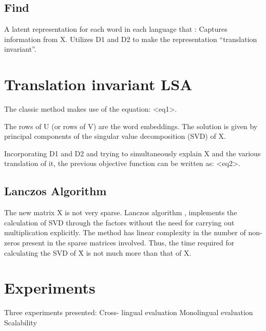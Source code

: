 \documentclass[11pt]{article}
\begin{document}
\subsection{Find}
A latent representation for each word in each language that :
Captures information from X.
Utilizes D1 and D2 to make the representation “translation invariant”.



\section{Translation invariant LSA}
The classic method makes use of the equation: <eq1>.

The rows of U (or rows of V) are the word embeddings.
The solution is given by principal components of the singular value decomposition (SVD) of X.

Incorporating D1 and D2 and trying to simultaneously explain X and the various translation of it, the previous objective function can be written as: <eq2>.

\subsection{Lanczos Algorithm}
The new matrix X is not very sparse.
Lanczos algorithm \cite{van1996matrix}, implements the calculation of SVD through the factors without the need for carrying out multiplication explicitly.
The method has linear complexity in the number of non-zeros present in the sparse matrices involved.
Thus, the time required for calculating the SVD of Ẋ is not much more than that of X.

\section{Experiments}
Three experiments presented:
Cross- lingual evaluation
Monolingual evaluation
Scalability





\end{document}
